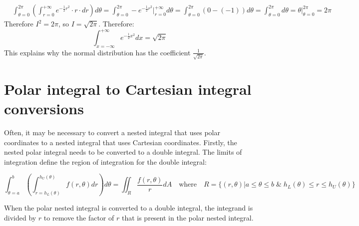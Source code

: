 \documentclass{article}
\begin{document}
\begin{align*}
& \int_{\theta = 0}^{2\pi} \left(\int_{r = 0}^{+\infty} e^{-\frac{1}{2}r^2} \cdot r \cdot dr \right)d\theta 
= \int_{\theta = 0}^{2\pi} -e^{-\frac{1}{2}r^2}\Big|_{r = 0}^{+\infty} d\theta 
= \int_{\theta = 0}^{2\pi} (0 - (-1))d\theta 
= \int_{\theta = 0}^{2\pi} d\theta 
= \theta\Big|_{\theta = 0}^{2\pi}
= 2\pi
\end{align*}
Therefore \(I^2 = 2\pi\), so \(I = \sqrt{2\pi}\). Therefore:
\[\int_{x = -\infty}^{+\infty} e^{-\frac{1}{2}x^2} dx = \sqrt{2\pi}\]
This explains why the normal distribution has the coefficient \(\frac{1}{\sqrt{2\pi}}\). 




\section*{Polar integral to Cartesian integral conversions} 

Often, it may be necessary to convert a nested integral that uses polar coordinates to a nested integral that uses Cartesian coordinates. Firstly, the nested polar integral needs to be converted to a double integral. The limits of integration define the region of integration for the double integral:

\[\int_{\theta = a}^b \left(\int_{r = h_L(\theta)}^{h_U(\theta)} f(r,\theta)dr\right)d\theta = \iint_R \frac{f(r,\theta)}{r}dA \quad\text{where}\quad R = \{(r,\theta) | a \leq \theta \leq b \;\&\; h_L(\theta) \leq r \leq h_U(\theta)\}\] 

When the polar nested integral is converted to a double integral, the integrand is divided by \(r\) to remove the factor of \(r\) that is present in the polar nested integral. 
\end{document}
